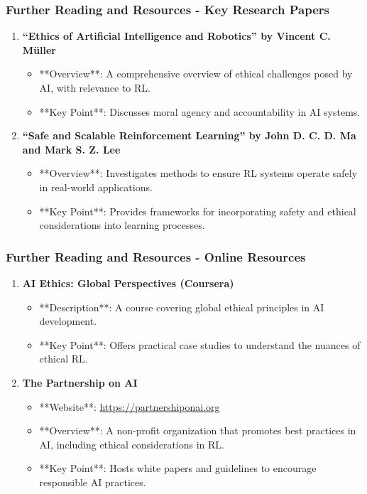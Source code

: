\documentclass[aspectratio=169]{beamer}
\begin{document}
\begin{frame}[fragile]
  \frametitle{Further Reading and Resources - Key Research Papers}
  \begin{enumerate}
    \item \textbf{“Ethics of Artificial Intelligence and Robotics” by Vincent C. Müller}
      \begin{itemize}
        \item **Overview**: A comprehensive overview of ethical challenges posed by AI, with relevance to RL.
        \item **Key Point**: Discusses moral agency and accountability in AI systems.
      \end{itemize}

    \item \textbf{“Safe and Scalable Reinforcement Learning” by John D. C. D. Ma and Mark S. Z. Lee}
      \begin{itemize}
        \item **Overview**: Investigates methods to ensure RL systems operate safely in real-world applications.
        \item **Key Point**: Provides frameworks for incorporating safety and ethical considerations into learning processes.
      \end{itemize}
  \end{enumerate}
\end{frame}

\begin{frame}[fragile]
  \frametitle{Further Reading and Resources - Online Resources}
  \begin{enumerate}
    \item \textbf{AI Ethics: Global Perspectives (Coursera)}
      \begin{itemize}
        \item **Description**: A course covering global ethical principles in AI development.
        \item **Key Point**: Offers practical case studies to understand the nuances of ethical RL.
      \end{itemize}

    \item \textbf{The Partnership on AI}
      \begin{itemize}
        \item **Website**: \url{https://partnershiponai.org}
        \item **Overview**: A non-profit organization that promotes best practices in AI, including ethical considerations in RL.
        \item **Key Point**: Hosts white papers and guidelines to encourage responsible AI practices.
      \end{itemize}
  \end{enumerate}
\end{frame}
\end{document}
